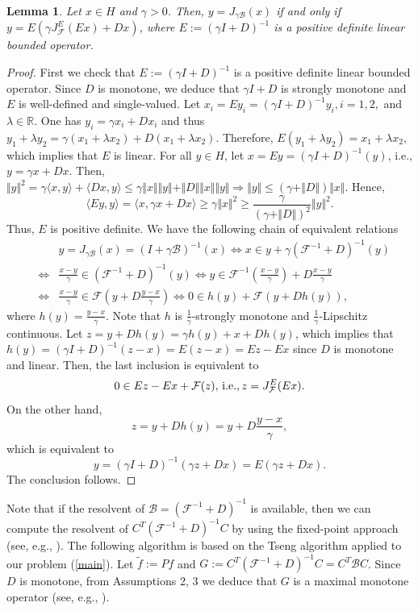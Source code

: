 \documentclass[11pt]{article}
\def\baqn{\begin{eqnarray*}}
\def\eaqn{\end{eqnarray*}}
\theoremstyle{plain}
\newtheorem{lemma}[theorem]{Lemma}
\newcommand{\R}{{\mathbb R}}
\begin{document}
{ \begin{lemma}\label{comp1}
Let $x\in H$ and $\gamma>0$. Then, $y=J_{\gamma \mathcal{B}}(x)$ if and only if  $y=E(\gamma J_\mathcal{F}^E(Ex)+Dx)$, where $E:=(\gamma I+D)^{-1}$ is a positive definite linear bounded operator. 
\end{lemma}
\begin{proof} First we check that $E:=(\gamma I+D)^{-1}$ is a positive definite linear bounded operator. Since $D$ is monotone, we deduce that $\gamma I+D$ is strongly monotone and $E$ is well-defined and single-valued. Let $x_i=Ey_i = (\gamma I+D)^{-1}y_i, i= 1,2,$ and $\lambda \in \R$. One has $y_i= \gamma x_i+Dx_i$ and thus $y_1+\lambda y_2=\gamma (x_1+\lambda x_2)+D(x_1+\lambda x_2)$. Therefore, $E(y_1+\lambda y_2)=x_1+\lambda x_2$, which implies that $E$ is linear. For all $y\in H$, let $x=Ey=(\gamma I+D)^{-1}(y)$, i.e., $y=\gamma x+Dx$.  Then, $\Vert y \Vert^2=\gamma \langle x, y \rangle +\langle Dx, y \rangle \le \gamma \Vert x \Vert \Vert y \Vert+\Vert D \Vert \Vert x \Vert \Vert y \Vert \Rightarrow \Vert y \Vert \le (\gamma+\Vert D \Vert) \Vert x \Vert$. Hence,
$$
\langle Ey,y \rangle = \langle x, \gamma x+Dx \rangle \ge\gamma \Vert x\Vert^2 \ge \frac{\gamma}{(\gamma+\Vert D \Vert)^2} \Vert y\Vert^2.
$$
Thus, $E$ is positive definite. 
 We have  the following chain of equivalent relations 
 \baqn
 &&y= J_{\gamma \mathcal{B}}(x)=(I+\gamma \mathcal{B})^{-1}(x) \Leftrightarrow x\in y +\gamma (\mathcal{F}^{-1}+D)^{-1}(y)  \\
 &\Leftrightarrow& \frac{x-y}{\gamma}\in (\mathcal{F}^{-1}+D)^{-1}(y) \Leftrightarrow y \in \mathcal{F}^{-1}(\frac{x-y}{\gamma})+D \frac{x-y}{\gamma} \\
  &\Leftrightarrow&   \frac{x-y}{\gamma}\in \mathcal{F}(y+D\frac{y-x}{\gamma}) \Leftrightarrow 0\in h(y)+ \mathcal{F}(y+Dh(y)),
 \eaqn
  where  $h(y)=\frac{y-x}{\gamma}$. Note that $h$ is {{$\frac{1}{\gamma}$-}}strongly monotone and $\frac{1}{\gamma}$-Lipschitz continuous. Let $z=y+Dh(y)=\gamma h(y)+x+Dh(y)$, which implies that $h(y)=(\gamma I+D)^{-1} (z-x)=E(z-x)=Ez-Ex$ since $D$ is monotone and linear.  Then, the last inclusion is equivalent to 
  \baqn
  0\in Ez-Ex+\mathcal{F}(z), \,{\rm i.e.,} \,z=J_\mathcal{F}^E(Ex).
  \eaqn
  On the other hand,
  $$
  z=y+Dh(y)=y+D\frac{y-x}{\gamma},$$
  which is equivalent to  $$y=(\gamma I+{D})^{-1}(\gamma z+Dx)=E(\gamma z+Dx).
  $$
  The conclusion follows. 
 \end{proof}
  Note that if the resolvent of $\mathcal{B}=(\mathcal{F}^{-1}+D)^{-1}$ is available, then we can compute the resolvent of $C^T(\mathcal{F}^{-1}+D)^{-1}C$ by using the fixed-point approach (see, e.g., \cite{al2,Micchelli}). The following algorithm is based on the Tseng algorithm \cite{Tseng} applied to our problem (\ref{main}). Let $\tilde{f}:= Pf$ and $G:={C}^T(\mathcal{F}^{-1}+D)^{-1} {C}={C}^T \mathcal{B} C$. Since $D$ is monotone, from Assumptions 2, 3 we deduce that $G$ is a maximal monotone operator (see, e.g., \cite{Pennanen}).\\
  
}
\end{document}
